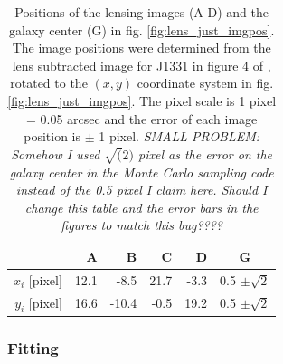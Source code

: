\documentclass[useAMS,usenatbib]{mn2e}
\begin{document}
\begin{table}
\centering
\begin{minipage}{70mm}
\begin{tabular}{r|rrrr|c}
\hline
  & A & B & C & D & G\\\hline
$x_i$ [pixel] & 12.1 & -8.5 & 21.7 & -3.3 & 0.5 $\pm \sqrt{2}$ \\
$y_i$ [pixel] & 16.6 & -10.4 & -0.5 & 19.2 & 0.5 $\pm \sqrt{2}$ \\
\hline
\end{tabular}
\caption{Positions of the lensing images (A-D) and the galaxy center (G) in fig. \ref{fig:lens_just_imgpos}. The image positions were determined from the lens subtracted image for J1331 in figure 4 of \citet{SWELLSIII}, rotated to the $(x,y)$ coordinate system in fig. \ref{fig:lens_just_imgpos}. The pixel scale is 1 pixel = 0.05 arcsec and the error of each image position is $\pm$ 1 pixel. \textit{SMALL PROBLEM: Somehow I used $\sqrt(2)$ pixel as the error on the galaxy center in the Monte Carlo sampling code instead of the 0.5 pixel I claim here. Should I change this table and the error bars in the figures to match this bug????}}
\label{tab:lenspos}
\end{minipage}
\end{table}


\subsubsection{Fitting}
\end{document}
